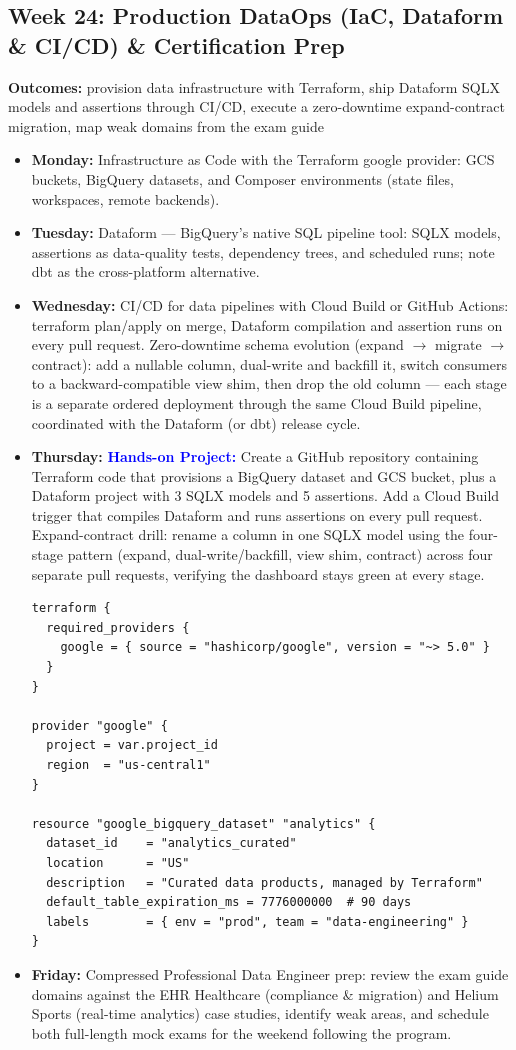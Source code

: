 \documentclass[11pt, a4paper]{article}
\newcommand{\project}[1]{\vspace{1mm}\noindent\textbf{\textcolor{blue}{Hands-on Project:}} #1}
\newcommand{\dayitem}[2]{\item \textbf{#1:} #2}
\begin{document}
\subsection*{Week 24: Production DataOps (IaC, Dataform \& CI/CD) \& Certification Prep}
\par\noindent\textbf{Outcomes:} provision data infrastructure with Terraform, ship Dataform SQLX models and assertions through CI/CD, execute a zero-downtime expand-contract migration, map weak domains from the exam guide
\begin{itemize}[label=-]
    \dayitem{Monday}{Infrastructure as Code with the Terraform google provider: GCS buckets, BigQuery datasets, and Composer environments (state files, workspaces, remote backends).}
    \dayitem{Tuesday}{Dataform --- BigQuery's native SQL pipeline tool: SQLX models, assertions as data-quality tests, dependency trees, and scheduled runs; note dbt as the cross-platform alternative.}
    \dayitem{Wednesday}{CI/CD for data pipelines with Cloud Build or GitHub Actions: terraform plan/apply on merge, Dataform compilation and assertion runs on every pull request. Zero-downtime schema evolution (expand $\rightarrow$ migrate $\rightarrow$ contract): add a nullable column, dual-write and backfill it, switch consumers to a backward-compatible view shim, then drop the old column --- each stage is a separate ordered deployment through the same Cloud Build pipeline, coordinated with the Dataform (or dbt) release cycle.}
    \dayitem{Thursday}{\project{Create a GitHub repository containing Terraform code that provisions a BigQuery dataset and GCS bucket, plus a Dataform project with 3 SQLX models and 5 assertions. Add a Cloud Build trigger that compiles Dataform and runs assertions on every pull request. Expand-contract drill: rename a column in one SQLX model using the four-stage pattern (expand, dual-write/backfill, view shim, contract) across four separate pull requests, verifying the dashboard stays green at every stage.}}
\begin{lstlisting}
terraform {
  required_providers {
    google = { source = "hashicorp/google", version = "~> 5.0" }
  }
}

provider "google" {
  project = var.project_id
  region  = "us-central1"
}

resource "google_bigquery_dataset" "analytics" {
  dataset_id    = "analytics_curated"
  location      = "US"
  description   = "Curated data products, managed by Terraform"
  default_table_expiration_ms = 7776000000  # 90 days
  labels        = { env = "prod", team = "data-engineering" }
}
\end{lstlisting}
    \dayitem{Friday}{Compressed Professional Data Engineer prep: review the exam guide domains against the EHR Healthcare (compliance \& migration) and Helium Sports (real-time analytics) case studies, identify weak areas, and schedule both full-length mock exams for the weekend following the program.}
\end{itemize}
\end{document}
